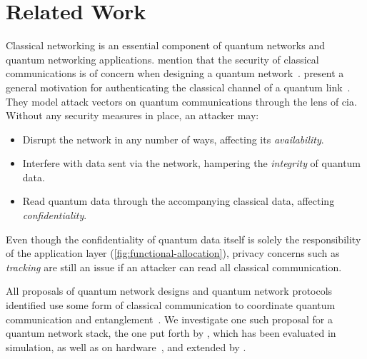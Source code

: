 \section{Related Work}
\label{sec:doa:relwork}

Classical networking is an essential component of quantum networks and quantum networking
applications. \citeauthor{kozlowski_2019_towards} mention that the security of classical
communications is of concern when designing a quantum network~\cite{kozlowski_2019_towards}.
\citeauthor{satoh_2020_attacking} present a general motivation for authenticating the classical
channel of a quantum link~\cite{satoh_2020_attacking}. They model attack vectors on quantum
communications through the lens of \acrfull{cia}. Without any security measures in place, an
attacker may:

\begin{itemize}
    \item Disrupt the network in any number of ways, affecting its \emph{availability}.
    \item Interfere with data sent via the network, hampering the \emph{integrity} of quantum data.
    \item Read quantum data through the accompanying classical data, affecting
          \emph{confidentiality}.
\end{itemize}
Even though the confidentiality of quantum data itself is solely the responsibility of the
application layer (\cref{fig:functional-allocation}), privacy concerns such as \emph{tracking} are
still an issue if an attacker can read all classical communication.

All proposals of quantum network designs and quantum network protocols identified use some form of
classical communication to coordinate quantum communication and
entanglement~\cite{van_meter_2013_repeaters, schoute_2016_shortcuts, joshi_2020_trusted,
pirker_2019_quantum, kozlowski_2019_towards, dahlberg_2019_egp, kozlowski_2020_qnp}. We investigate
one such proposal for a quantum network stack, the one put forth by \textcite{dahlberg_2019_egp},
which has been evaluated in simulation, as well as on hardware~\cite{pompili_2022_experimental}, and
extended by \textcite{kozlowski_2020_qnp}.

